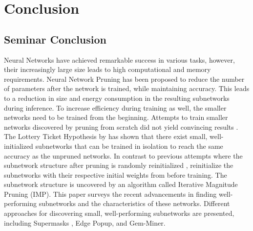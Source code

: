 \chapter{Conclusion}


\section{Seminar Conclusion}
Neural Networks have achieved remarkable success in various tasks, however, their increasingly large size leads to high computational and memory requirements.
Neural Network Pruning \autocite{LeCun, OptimalBrainSurgeon, HanEtAl15, PruningFiltersForEfficientConvets} has been proposed to reduce the number of parameters after the network is trained, while maintaining accuracy.
This leads to a reduction in size \autocite{HanEtAl15} and energy consumption \autocite{YangCS17} in the resulting subnetworks during inference.
To increase efficiency during training as well, the smaller networks need to be trained from the beginning. Attempts to train smaller networks discovered by pruning from scratch did not yield convincing results \autocite{HanEtAl15, PruningFiltersForEfficientConvets}.
The Lottery Ticket Hypothesis by \textcite{LTH} has shown that there exist small, well-initialized subnetworks that can be trained in isolation to reach the same accuracy as the unpruned networks. 
In contrast to previous attempts where the subnetwork structure after pruning is randomly reinitialized \autocite{HanEtAl15, PruningFiltersForEfficientConvets}, \textcite{LTH} reinitialize the subnetworks with their respective initial weights from before training.
The subnetwork structure is uncovered by an algorithm called Iterative Magnitude Pruning (IMP).
This paper surveys the recent advancements in finding well-performing subnetworks and the characteristics of these networks. Different approaches for discovering small, well-performing subnetworks are presented, including Supermasks \autocite{Supermasks}, Edge Popup\autocite{EdgePopup}, and Gem-Miner\autocite{RareGems}.